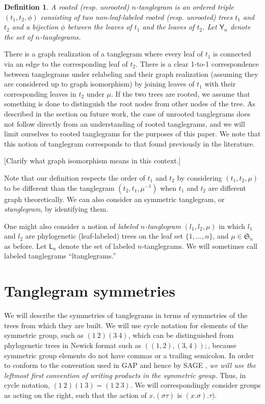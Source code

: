 \documentclass{amsart}
\newtheorem{definition}{Definition}
\newcommand{\fS}{\mathfrak S}
\newcommand{\pairing}{\mu}
\newcommand{\tangle}{\mathsf{Y}}
\newcommand{\ltangle}{\mathsf{L}}
\begin{document}
\begin{definition}
\label{def:tanglegram}
A rooted (resp. unrooted) $n$-\emph{tanglegram} is an ordered triple $(t_1, t_2, \phi)$ consisting of two non-leaf-labeled rooted (resp. unrooted) trees $t_1$ and $t_2$ and a bijection $\phi$ between the leaves of $t_1$ and the leaves of $t_2$.
Let $\tangle_n$ denote the set of $n$-tanglegrams.
\end{definition}
There is a graph realization of a tanglegram where every leaf of $t_1$ is connected via an edge to the corresponding leaf of $t_2$.
There is a clear 1-to-1 correspondence between tanglegrams under relabeling and their graph realization (assuming they are considered up to graph isomorphism) by joining leaves of $t_1$ with their corresponding leaves in $t_2$ under $\pairing$.
If the two trees are rooted, we assume that something is done to distinguish the root nodes from other nodes of the tree.
As described in the section on future work, the case of unrooted tanglegrams does not follow directly from an understanding of rooted tanglegrams, and we will limit ourselves to rooted tanglegrams for the purposes of this paper.
We note that this notion of tanglegram corresponds to that found previously in the literature.

[Clarify what graph isomorphism means in this context.]

Note that our definition respects the order of $t_1$ and $t_2$ by considering $(t_1, t_2, \pairing)$ to be different than the tanglegram $(t_2, t_1, \pairing^{-1})$ when $t_1$ and $t_2$ are different graph theoretically.
We can also consider an symmetric tanglegram, or \emph{stanglegram}, by identifying them.

One might also consider a notion of \emph{labeled $n$-tanglegram} $(l_1, l_2, \pairing)$ in which $l_1$ and $l_2$ are phylogenetic (leaf-labeled) trees on the leaf set $\{1, \ldots, n\}$, and $\pairing \in \fS_n$ as before.
Let $\ltangle_n$ denote the set of labeled $n$-tanglegrams.
We will sometimes call labeled tanglegrams ``ltanglegrams.''


\section{Tanglegram symmetries}
We will describe the symmetries of tanglegrams in terms of symmetries of the trees from which they are built.
We will use cycle notation for elements of the symmetric group, such as $(1\ 2) (3\ 4)$, which can be distinguished from phylogenetic trees in Newick format \cite{wiki:newick} such as $((1,2),(3,4));$, because symmetric group elements do not have commas or a trailing semicolon.
In order to conform to the convention used in GAP \cite{GAP4} and hence by SAGE \cite{SteinJoyner2005}, \emph{we will use the leftmost first convention of writing products in the symmetric group.}
Thus, in cycle notation, $(1\ 2) (1\ 3) = (1\ 2\ 3)$.
We will correspondingly consider groups as acting on the right, such that the action of $x.(\sigma \tau)$ is $(x.\sigma) . \tau)$.
\end{document}
